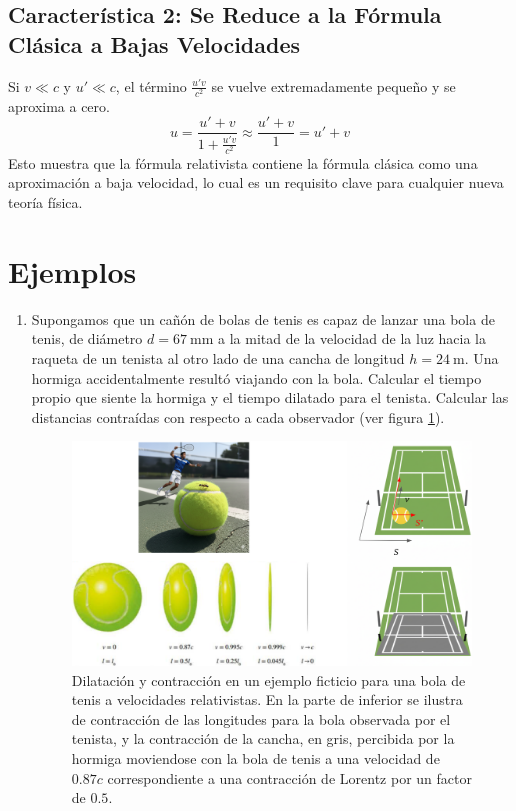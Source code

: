 \documentclass[11pt,a4paper]{article}
\begin{document}
\subsection{Característica 2: Se Reduce a la Fórmula Clásica a Bajas Velocidades}
Si $v \ll c$ y $u' \ll c$, el término $\frac{u'v}{c^2}$ se vuelve extremadamente pequeño y se aproxima a cero.
\[ u = \frac{u' + v}{1 + \frac{u'v}{c^2}} \approx \frac{u' + v}{1} = u' + v \]
Esto muestra que la fórmula relativista contiene la fórmula clásica como una aproximación a baja velocidad, lo cual es un requisito clave para cualquier nueva teoría física.


\section{Ejemplos}
\begin{enumerate}
\item Supongamos que un cañón de bolas de tenis es capaz de lanzar una bola de tenis, de diámetro $d = \qty{67}{\milli\m}$  a la mitad de la velocidad de la luz hacia la raqueta de un tenista al otro lado de una cancha de longitud $h=\qty{24}{\m}$. Una hormiga accidentalmente resultó viajando con la bola. Calcular el tiempo propio que siente la hormiga y el tiempo dilatado para el tenista. Calcular las distancias contraídas con respecto a cada observador (ver figura \ref{fig:dilcon}). 

\begin{figure}
    \centering
    \includegraphics[width=1\linewidth]{tennis.png}
    \caption{Dilatación y contracción en un ejemplo ficticio para una bola de tenis a velocidades relativistas. En la parte de inferior se ilustra de contracción de las longitudes para la bola observada por el tenista, y la contracción de la cancha, en gris, percibida por la hormiga moviendose con la bola de tenis a una velocidad de $0.87c$ correspondiente a una contracción de Lorentz por un factor de $0.5$.}
    \label{fig:dilcon}
\end{figure}


\end{enumerate}
\end{document}
